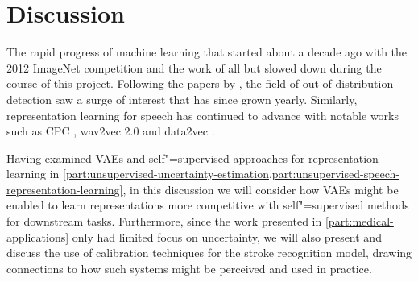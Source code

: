 
\chapter[discussion]{Discussion}\label{chp:discussion}
%






The rapid progress of machine learning that started about a decade ago with the 2012 ImageNet competition and the work of \textcite{krizhevsky_imagenet_2012} all but slowed down during the course of this project. 
Following the papers by \textcite{choi_waic_2019,nalisnick_detecting_2019,hendrycks_deep_2019}, the field of out-of-distribution detection saw a surge of interest that has since grown yearly. Similarly, representation learning for speech has continued to advance with notable works such as CPC \parencite{oord_representation_2018}, wav2vec 2.0 \parencite{baevski_wav2vec_2020} and data2vec \parencite{baevski_data2vec_2022}. 

Having examined VAEs and self"=supervised approaches for representation learning in \cref{part:unsupervised-uncertainty-estimation,part:unsupervised-speech-representation-learning}, in this discussion we will consider how VAEs might be enabled to learn representations more competitive with self"=supervised methods for downstream tasks. 
Furthermore, since the work presented in \cref{part:medical-applications} only had limited focus on uncertainty, we will also present and discuss the use of calibration techniques for the stroke recognition model, drawing connections to how such systems might be perceived and used in practice. 

